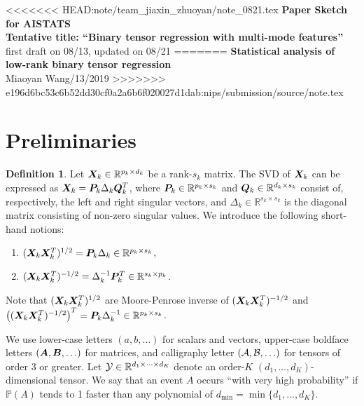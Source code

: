\documentclass[11pt]{article}
\theoremstyle{plain}
\theoremstyle{definition}
\newtheorem{defn}{Definition}
\begin{document}
\begin{center}
<<<<<<< HEAD:note/team_jiaxin_zhuoyan/note_0821.tex
{\bf \large Paper Sketch for AISTATS\\
Tentative title: ``Binary tensor regression with multi-mode features''}\\
first draft on 08/13, updated on 08/21
=======
{\bf \large Statistical analysis of low-rank binary tensor regression}\\
Miaoyan Wang/13/2019
>>>>>>> e196d6bc53c6b52dd30cf0a2a6b6f020027d1dab:nips/submission/source/note.tex
\end{center}

\section{Preliminaries}
\begin{defn}\label{eq:defn}
Let $\bm X_k\in\mathbb{R}^{p_k\times d_k}$ be a rank-$s_k$ matrix. The SVD of $\bm X_k$ can be expressed as $\bm X_k=\bm{P}_k\Delta_k \bm{Q}^T_k$, where $\bm{P}_k\in\mathbb{R}^{p_k\times s_k}$ and $\bm{Q}_k\in\mathbb{R}^{d_k\times s_k}$ consist of, respectively, the left and right singular vectors, and $\Delta_k\in\mathbb{R}^{s_k\times s_k}$ is the diagonal matrix consisting of non-zero singular values. We introduce the following short-hand notions:
\begin{enumerate}
\item $(\bm X_k\bm X^T_k)^{1/2}=\bm{P}_k\Delta_k\in\mathbb{R}^{p_k\times s_k}$,
\item $(\bm X_k\bm X^T_k)^{-1/2}=\Delta^{-1}_k\bm{P}^T_k\in\mathbb{R}^{s_k\times p_k}$.
\end{enumerate}

Note that $(\bm X_k\bm X^T_k)^{1/2}$ are  Moore-Penrose inverse of $(\bm X_k\bm X^T_k)^{-1/2}$ and $\left((\bm X_k\bm X^T_k)^{-1/2}\right)^T=\bm{P}_k\Delta^{-1}_k\in\mathbb{R}^{p_k\times s_k}$.
\end{defn}

We use lower-case letters $(a, b, \ldots)$ for scalars and vectors, upper-case boldface letters $(\bm A, \bm B, \ldots)$ for matrices, and calligraphy letter $(\mathcal{A},\mathcal{B},\ldots)$ for tensors of order 3 or greater. Let $\mathcal{Y} \in \mathbb{R}^{d_1\times \cdots \times d_K}$ denote an order-$K$ $(d_1,\ldots,d_K)$-dimensional tensor. We say that an event $A$ occurs ``with very high probability'' if $\mathbb{P}(A)$ tends to 1 faster than any polynomial of $d_{\min}=\min\{d_1, . . . , d_K\}$.
\end{document}
